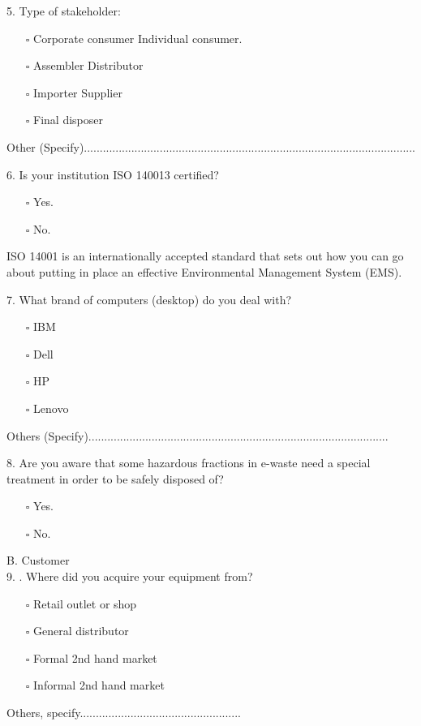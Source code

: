 \documentclass{article}
\begin{document}
5. Type of stakeholder:
\begin{itemize}
\item[$\square$]Corporate consumer Individual consumer.
\item[$\square$]  Assembler Distributor
\item[$\square$] Importer Supplier                                  
\item[$\square$] Final disposer
\end{itemize}
Other (Specify).........................................................................................................

6. Is your institution ISO 140013 certified? 
\begin{itemize}
\item[$\square$]Yes.
\item[$\square$] No.
\end{itemize}
ISO 14001 is an internationally accepted standard that sets out how you can go
about putting in place an effective Environmental Management System (EMS). 

7. What brand of computers (desktop) do you deal with?
\begin{itemize}
\item[$\square$]IBM
\item[$\square$] Dell
\item[$\square$]HP                                  
\item[$\square$] Lenovo
\end{itemize}
Others (Specify)...............................................................................................

8. Are you aware that some hazardous fractions in e-waste need a special
treatment in order to be safely disposed of?
\begin{itemize}
\item[$\square$]Yes.
\item[$\square$] No.
\end{itemize}

 B. Customer\\

9. . Where did you acquire your equipment from?
\begin{itemize}
\item[$\square$]Retail outlet or shop
\item[$\square$] General distributor
\item[$\square$]Formal 2nd hand market
\item[$\square$]Informal 2nd hand market
\end{itemize}
Others, specify...................................................
\end{document}
